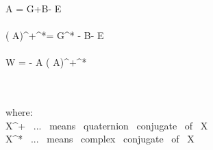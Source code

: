 \widehat{ \Box } \widehat A = G+\vec B-\imath{} \vec E \\\\

(\widehat{ \Box } \widehat A)^+^*= G^* - \vec B-\imath{} \vec E \\\\

\widehat W =  -  \widehat{ \Box } \widehat A (\widehat{ \Box } \widehat A)^+^*


\\\\

where: 
\\
\widehat X^+ \ ... \ means \ quaternion \ conjugate \ of \ \widehat X
\\
\widehat X^* \ ...  \ means \ complex \ conjugate \ of \ \widehat X  


